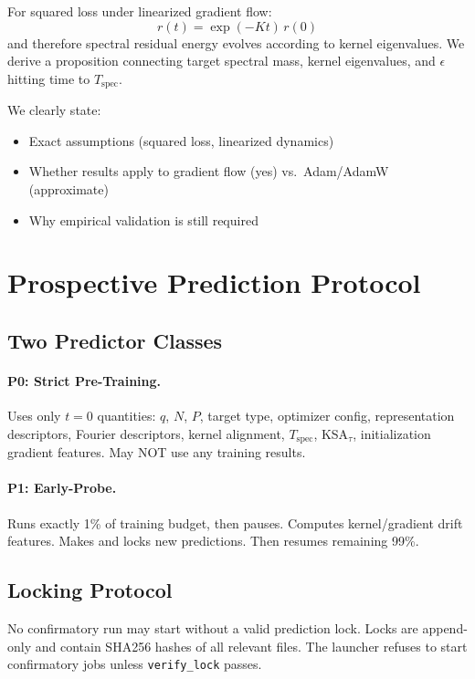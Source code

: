 \documentclass[11pt]{article}
\begin{document}
For squared loss under linearized gradient flow:
\begin{equation}
r(t) = \exp(-Kt) \, r(0)
\end{equation}
and therefore spectral residual energy evolves according to kernel eigenvalues. We derive a proposition connecting target spectral mass, kernel eigenvalues, and $\epsilon$ hitting time to $T_{\text{spec}}$.

We clearly state:
\begin{itemize}[leftmargin=*]
    \item Exact assumptions (squared loss, linearized dynamics)
    \item Whether results apply to gradient flow (yes) vs.\ Adam/AdamW (approximate)
    \item Why empirical validation is still required
\end{itemize}

\section{Prospective Prediction Protocol}\label{sec:protocol}

\subsection{Two Predictor Classes}

\paragraph{P0: Strict Pre-Training.} Uses only $t=0$ quantities: $q$, $N$, $P$, target type, optimizer config, representation descriptors, Fourier descriptors, kernel alignment, $T_{\text{spec}}$, KSA$_\tau$, initialization gradient features. May NOT use any training results.

\paragraph{P1: Early-Probe.} Runs exactly 1\% of training budget, then pauses. Computes kernel/gradient drift features. Makes and locks new predictions. Then resumes remaining 99\%.

\subsection{Locking Protocol}

No confirmatory run may start without a valid prediction lock. Locks are append-only and contain SHA256 hashes of all relevant files. The launcher refuses to start confirmatory jobs unless \texttt{verify\_lock} passes.
\end{document}
